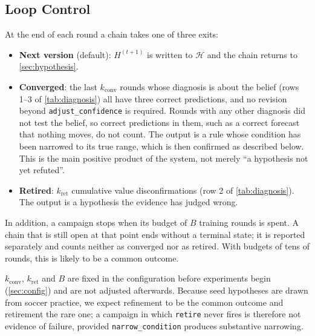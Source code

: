 \documentclass[11pt]{article}
\newcommand{\Hst}{\mathcal{H}}           %
\newcommand{\code}[1]{\texttt{\small #1}}
\begin{document}
\subsection{Loop Control}
\label{sec:control}

At the end of each round a chain takes one of three exits:
\begin{itemize}[leftmargin=*,itemsep=2pt]
  \item \textbf{Next version} (default): $H^{(t+1)}$ is written to $\Hst$ and the chain returns to \cref{sec:hypothesis}.
  \item \textbf{Converged}: the last $k_{\mathrm{conv}}$ rounds whose diagnosis is about the belief (rows 1--3 of \cref{tab:diagnosis}) all have three correct predictions, and no revision beyond \code{adjust\_confidence} is required.
    Rounds with any other diagnosis did not test the belief, so correct predictions in them, such as a correct forecast that nothing moves, do not count.
    The output is a rule whose condition has been narrowed to its true range, which is then confirmed as described below.
    This is the main positive product of the system, not merely ``a hypothesis not yet refuted''.
  \item \textbf{Retired}: $k_{\mathrm{ret}}$ cumulative value disconfirmations (row 2 of \cref{tab:diagnosis}).
    The output is a hypothesis the evidence has judged wrong.
\end{itemize}
In addition, a campaign stops when its budget of $B$ training rounds is spent.
A chain that is still open at that point ends without a terminal state; it is reported separately and counts neither as converged nor as retired.
With budgets of tens of rounds, this is likely to be a common outcome.

$k_{\mathrm{conv}}$, $k_{\mathrm{ret}}$ and $B$ are fixed in the configuration before experiments begin (\cref{sec:config}) and are not adjusted afterwards.
Because seed hypotheses are drawn from soccer practice, we expect refinement to be the common outcome and retirement the rare one; a campaign in which \code{retire} never fires is therefore not evidence of failure, provided \code{narrow\_condition} produces substantive narrowing.
\end{document}
